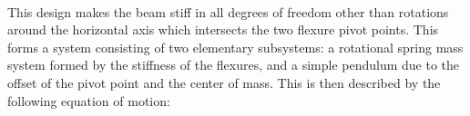 \documentclass [12pt, proquest]{uwthesis}[2019]
\begin{document}
\begin{figure}%
\begin{center}
\\
\caption{}
\label{BRS}
\end{center}
\end{figure}

This design makes the beam stiff in all degrees of freedom other than rotations around the horizontal axis which intersects the two flexure pivot points. This forms a system consisting of two elementary subsystems: a rotational spring mass system formed by the stiffness of the flexures, and a simple pendulum due to the offset of the pivot point and the center of mass. This is then described by the following equation of motion: \cite{venk2014}
\end{document}
